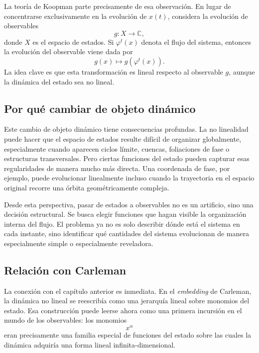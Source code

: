 La teoría de Koopman parte precisamente de esa observación. En lugar de concentrarse exclusivamente en la evolución de \(x(t)\), considera la evolución de observables
\begin{equation}
g:X\to\mathbb{C},
\label{eq:Koopman_motivation_observable}
\end{equation}
donde \(X\) es el espacio de estados. Si \(\varphi^t(x)\) denota el flujo del sistema, entonces la evolución del observable viene dada por
\begin{equation}
g(x)\longmapsto g(\varphi^t(x)).
\label{eq:Koopman_motivation_flow_observable}
\end{equation}
La idea clave es que esta transformación es lineal respecto al observable \(g\), aunque la dinámica del estado sea no lineal.

\subsection{Por qué cambiar de objeto dinámico}

Este cambio de objeto dinámico tiene consecuencias profundas. La no linealidad puede hacer que el espacio de estados resulte difícil de organizar globalmente, especialmente cuando aparecen ciclos límite, cuencas, foliaciones de fase o estructuras transversales. Pero ciertas funciones del estado pueden capturar esas regularidades de manera mucho más directa. Una coordenada de fase, por ejemplo, puede evolucionar linealmente incluso cuando la trayectoria en el espacio original recorre una órbita geométricamente compleja.

Desde esta perspectiva, pasar de estados a observables no es un artificio, sino una decisión estructural. Se busca elegir funciones que hagan visible la organización interna del flujo. El problema ya no es solo describir dónde está el sistema en cada instante, sino identificar qué cantidades del sistema evolucionan de manera especialmente simple o especialmente reveladora.

\subsection{Relación con Carleman}

La conexión con el capítulo anterior es inmediata. En el \emph{embedding} de Carleman, la dinámica no lineal se reescribía como una jerarquía lineal sobre monomios del estado. Esa construcción puede leerse ahora como una primera incursión en el mundo de los observables: los monomios
\[
x^\alpha
\]
eran precisamente una familia especial de funciones del estado sobre las cuales la dinámica adquiría una forma lineal infinita-dimensional.

